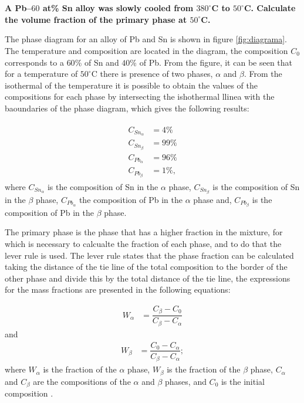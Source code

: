 \section{}

\subsection{}
\textbf{A Pb–$60$ at\% Sn alloy was slowly cooled from $380^{\circ}$C to $50^{\circ}$C. Calculate the volume fraction of the primary phase at $50^{\circ}$C.}

The phase diagram for an alloy of Pb and Sn is shown in figure \ref{fig:diagrama}. The temperature and composition are located in the diagram, the composition $C_0$ corresponds to a $60$\% of Sn and $40$\% of Pb. From the figure, it can be seen that for a temperature of $50^{\circ}$C there is presence of two phases, $\alpha$ and $\beta$. From the isothermal of the temperature it is possible to obtain the values of the compositions for each phase by intersecting the ishothermal llinea with the baoundaries of the phase diagram, which gives the following results:

\begin{align}
    \label{eq:compostitions}
    \begin{split}
        C_{Sn_{\alpha}}&=4\% \\ C_{Sn_{\beta}}&=99\% \\ C_{Pb_{\alpha}}&=96\% \\ C_{Pb_{\beta}}&=1\%,
    \end{split}
\end{align}
where $C_{Sn_{\alpha}}$ is the composition of Sn in the $\alpha$ phase, $C_{Sn_{\beta}}$ is the composition of Sn in the $\beta$ phase, $C_{Pb_{\alpha}}$ the composition of Pb in the $\alpha$ phase and, $C_{Pb_{\beta}}$ is the composition of Pb in the $\beta$ phase.

The primary phase is the phase that has a higher fraction in the mixture, for which is necessary to calcualte the fraction of each phase, and to do that the lever rule is used. The lever rule states that the phase fraction can be calculated taking the distance of the tie line of the total composition to the border of the other phase and divide this by the total distance of the tie line, the expressions for the mass fractions are presented in the following equations:

\begin{align}
    \label{eq:frac_alpha}
    W_{\alpha}&=\dfrac{C_{\beta}-C_0}{C_{\beta}-C_{\alpha}}
\end{align}
and
\begin{align}
    \label{eq:frac_beta}
    W_{\beta}&=\dfrac{C_0-C_{\alpha}}{C_{\beta}-C_{\alpha}};
\end{align}
where $W_{\alpha}$ is the fraction of the $\alpha$ phase, $W_{\beta}$ is the fraction of the $\beta$ phase, $C_{\alpha}$ and $C_{\beta}$ are the compositions of the $\alpha$ and $\beta$ phases, and $C_0$ is the initial composition \citep[p.~290-291]{callister2010materials}. 

